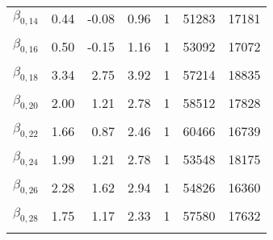 \begin{table}
\begin{tabular}[t]{lrrrrrr}
$\beta_{0, 14}$ & 0.44 & -0.08 & 0.96 & 1 & 51283 & 17181\\
\cellcolor{gray!6}{$\beta_{0, 15}$} & \cellcolor{gray!6}{2.20} & \cellcolor{gray!6}{1.42} & \cellcolor{gray!6}{2.98} & \cellcolor{gray!6}{1} & \cellcolor{gray!6}{60643} & \cellcolor{gray!6}{18524}\\
$\beta_{0, 16}$ & 0.50 & -0.15 & 1.16 & 1 & 53092 & 17072\\
\cellcolor{gray!6}{$\beta_{0, 17}$} & \cellcolor{gray!6}{3.41} & \cellcolor{gray!6}{2.63} & \cellcolor{gray!6}{4.20} & \cellcolor{gray!6}{1} & \cellcolor{gray!6}{56160} & \cellcolor{gray!6}{18894}\\
$\beta_{0, 18}$ & 3.34 & 2.75 & 3.92 & 1 & 57214 & 18835\\
\cellcolor{gray!6}{$\beta_{0, 19}$} & \cellcolor{gray!6}{1.57} & \cellcolor{gray!6}{1.00} & \cellcolor{gray!6}{2.15} & \cellcolor{gray!6}{1} & \cellcolor{gray!6}{58884} & \cellcolor{gray!6}{17634}\\
$\beta_{0, 20}$ & 2.00 & 1.21 & 2.78 & 1 & 58512 & 17828\\
\cellcolor{gray!6}{$\beta_{0, 21}$} & \cellcolor{gray!6}{1.27} & \cellcolor{gray!6}{0.70} & \cellcolor{gray!6}{1.84} & \cellcolor{gray!6}{1} & \cellcolor{gray!6}{62669} & \cellcolor{gray!6}{17610}\\
$\beta_{0, 22}$ & 1.66 & 0.87 & 2.46 & 1 & 60466 & 16739\\
\cellcolor{gray!6}{$\beta_{0, 23}$} & \cellcolor{gray!6}{4.17} & \cellcolor{gray!6}{3.58} & \cellcolor{gray!6}{4.75} & \cellcolor{gray!6}{1} & \cellcolor{gray!6}{56260} & \cellcolor{gray!6}{18053}\\
$\beta_{0, 24}$ & 1.99 & 1.21 & 2.78 & 1 & 53548 & 18175\\
\cellcolor{gray!6}{$\beta_{0, 25}$} & \cellcolor{gray!6}{1.08} & \cellcolor{gray!6}{0.56} & \cellcolor{gray!6}{1.60} & \cellcolor{gray!6}{1} & \cellcolor{gray!6}{57557} & \cellcolor{gray!6}{17998}\\
$\beta_{0, 26}$ & 2.28 & 1.62 & 2.94 & 1 & 54826 & 16360\\
\cellcolor{gray!6}{$\beta_{0, 27}$} & \cellcolor{gray!6}{2.33} & \cellcolor{gray!6}{1.54} & \cellcolor{gray!6}{3.10} & \cellcolor{gray!6}{1} & \cellcolor{gray!6}{54595} & \cellcolor{gray!6}{18174}\\
$\beta_{0, 28}$ & 1.75 & 1.17 & 2.33 & 1 & 57580 & 17632\\
\cellcolor{gray!6}{$\beta_{0, 29}$} & \cellcolor{gray!6}{2.94} & \cellcolor{gray!6}{2.37} & \cellcolor{gray!6}{3.51} & \cellcolor{gray!6}{1} & \cellcolor{gray!6}{58269} & \cellcolor{gray!6}{16935}\\

\end{tabular}
\end{table}
